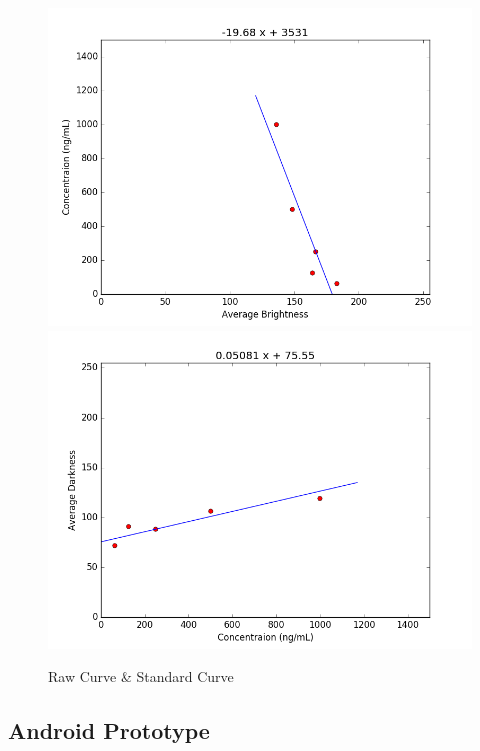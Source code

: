 \documentclass[runningheads,a4paper]{llncs}
\begin{document}
\begin{figure}[h!]
\begin{center}
\includegraphics[scale=0.23]{raw}
\includegraphics[scale=0.23]{stand}
\caption{Raw Curve \& Standard Curve}
\end{center}
\end{figure}

\subsection{Android Prototype}
\end{document}
